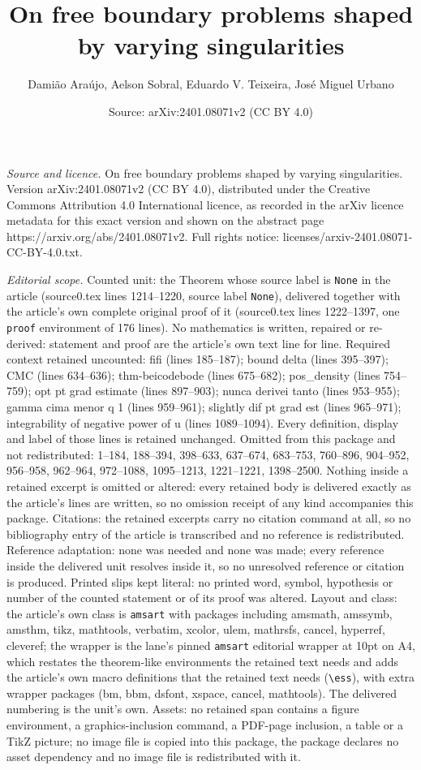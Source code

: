 \documentclass[10pt,a4paper]{amsart}
\title[On free boundary problems shaped by varying singularities]{On free boundary problems shaped by varying singularities}
\author{Dami\~ao Ara\'ujo, Aelson Sobral, Eduardo V. Teixeira, Jos\'e Miguel Urbano}
\date{Source: arXiv:2401.08071v2 (CC BY 4.0)}
\begin{document}
\maketitle

\noindent\emph{Source and licence.} On free boundary problems shaped by varying singularities. Version arXiv:2401.08071v2 (CC BY 4.0), distributed under the Creative Commons Attribution 4.0 International licence, as recorded in the arXiv licence metadata for this exact version and shown on the abstract page https://arxiv.org/abs/2401.08071v2. Full rights notice: licenses/arxiv-2401.08071-CC-BY-4.0.txt.\par\smallskip

\noindent\textit{Editorial scope.} Counted unit: the Theorem whose source label is \texttt{None} in the article (source0.tex lines 1214--1220, source label \texttt{None}), delivered together with the article's own complete original proof of it (source0.tex lines 1222--1397, one \texttt{proof} environment of 176 lines). No mathematics is written, repaired or re-derived: statement and proof are the article's own text line for line. Required context retained uncounted: fifi (lines 185--187); bound delta (lines 395--397); CMC (lines 634--636); thm-beicodebode (lines 675--682); pos\_density (lines 754--759); opt pt grad estimate (lines 897--903); nunca derivei tanto (lines 953--955); gamma cima menor q 1 (lines 959--961); slightly dif pt grad est (lines 965--971); integrability of negative power of u (lines 1089--1094). Every definition, display and label of those lines is retained unchanged. Omitted from this package and not redistributed: 1--184, 188--394, 398--633, 637--674, 683--753, 760--896, 904--952, 956--958, 962--964, 972--1088, 1095--1213, 1221--1221, 1398--2500. Nothing inside a retained excerpt is omitted or altered: every retained body is delivered exactly as the article's lines are written, so no omission receipt of any kind accompanies this package. Citations: the retained excerpts carry no citation command at all, so no bibliography entry of the article is transcribed and no reference is redistributed. Reference adaptation: none was needed and none was made; every reference inside the delivered unit resolves inside it, so no unresolved reference or citation is produced. Printed slips kept literal: no printed word, symbol, hypothesis or number of the counted statement or of its proof was altered. Layout and class: the article's own class is \texttt{amsart} with packages including amsmath, amssymb, amsthm, tikz, mathtools, verbatim, xcolor, ulem, mathrsfs, cancel, hyperref, cleveref; the wrapper is the lane's pinned \texttt{amsart} editorial wrapper at 10pt on A4, which restates the theorem-like environments the retained text needs and adds the article's own macro definitions that the retained text needs (\texttt{\textbackslash ess}), with extra wrapper packages (bm, bbm, dsfont, xspace, cancel, mathtools). The delivered numbering is the unit's own. Assets: no retained span contains a figure environment, a graphics-inclusion command, a PDF-page inclusion, a table or a TikZ picture; no image file is copied into this package, the package declares no asset dependency and no image file is redistributed with it. 
\end{document}
